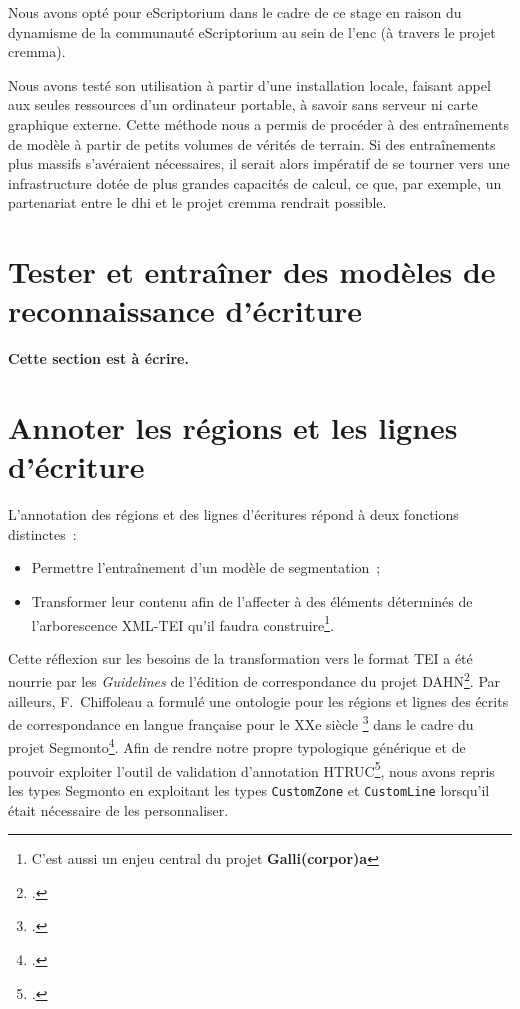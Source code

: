 \documentclass[a4paper,12pt,twoside]{book}
\begin{document}
			Nous avons opté pour eScriptorium dans le cadre de ce stage en raison du dynamisme de la communauté eScriptorium au sein de l'\gls{enc} (à travers le projet \gls{cremma}).

			Nous avons testé son utilisation à partir d'une installation locale, faisant appel aux seules ressources d'un ordinateur portable, à savoir sans serveur ni carte graphique externe. Cette méthode nous a permis de procéder à des entraînements de modèle à partir de petits volumes de vérités de terrain. Si des entraînements plus massifs s'avéraient nécessaires, il serait alors impératif de se tourner vers une infrastructure dotée de plus grandes capacités de calcul, ce que, par exemple, un partenariat entre le \gls{dhi} et le projet \gls{cremma} rendrait possible.
				
		\section{Tester et entraîner des modèles de reconnaissance d'écriture}
			\textbf{Cette section est à écrire.}
		
		\section{Annoter les régions et les lignes d'écriture}
			L'annotation des régions et des lignes d'écritures répond à deux fonctions distinctes~:
			
			\begin{itemize}
				\item Permettre l'entraînement d'un modèle de segmentation~;
				\item Transformer leur contenu afin de l'affecter à des éléments déterminés de l'arborescence XML-TEI qu'il faudra construire\footnote{C'est aussi un enjeu central du projet \textbf{Galli(corpor)a}}.
			\end{itemize}

				Cette réflexion sur les besoins de la transformation vers le format TEI a été nourrie par les \textit{Guidelines} de l'édition de correspondance du projet DAHN\footcite{chiffoleauCorrespondenceGuidelines2022}. Par ailleurs, F.~Chiffoleau a formulé une ontologie pour les régions et lignes des écrits de correspondance en langue française pour le XXe siècle \footcite{chiffoleauCorrespondanceLangueFrancaise2021} dans le cadre du projet \gls{Segmonto}\footcite{gabaySegmOntoCommonVocabulary2021}. Afin de rendre notre propre typologique générique et de pouvoir exploiter l'outil de validation d'annotation HTRUC\footcite{clericeHTRUCHTRUnitedCatalog2021}, nous avons repris les types \gls{Segmonto} en exploitant les types \texttt{CustomZone} et \texttt{CustomLine} lorsqu'il était nécessaire de les personnaliser.
\end{document}

